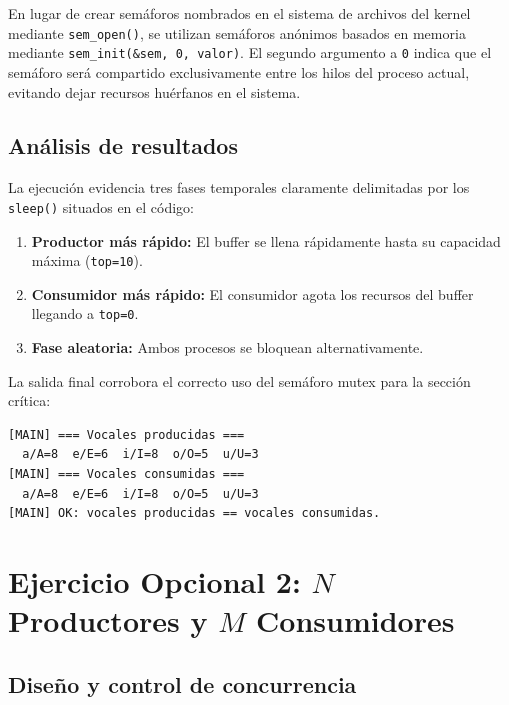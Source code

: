 \documentclass[a4paper, 12pt]{article}
\newcommand{\ic}[1]{\texttt{#1}}
\begin{document}
\begin{infobox}
  En lugar de crear semáforos nombrados en el sistema de archivos del kernel mediante \ic{sem\_open()}, se utilizan semáforos anónimos basados en memoria mediante \ic{sem\_init(\&sem, 0, valor)}. El segundo argumento a \ic{0} indica que el semáforo será compartido exclusivamente entre los hilos del proceso actual, evitando dejar recursos huérfanos en el sistema.
\end{infobox}

\subsection{Análisis de resultados}

La ejecución evidencia tres fases temporales claramente delimitadas por los \ic{sleep()} situados en el código:
\begin{enumerate}
    \item \textbf{Productor más rápido:} El buffer se llena rápidamente hasta su capacidad máxima (\ic{top=10}).
    \item \textbf{Consumidor más rápido:} El consumidor agota los recursos del buffer llegando a \ic{top=0}.
    \item \textbf{Fase aleatoria:} Ambos procesos se bloquean alternativamente.
\end{enumerate}

La salida final corrobora el correcto uso del semáforo mutex para la sección crítica:

\begin{lstlisting}[style=shellstyle]
[MAIN] === Vocales producidas ===
  a/A=8  e/E=6  i/I=8  o/O=5  u/U=3
[MAIN] === Vocales consumidas ===
  a/A=8  e/E=6  i/I=8  o/O=5  u/U=3
[MAIN] OK: vocales producidas == vocales consumidas.
\end{lstlisting}

\newpage

\section{Ejercicio Opcional 2: $N$ Productores y $M$ Consumidores}



\subsection{Diseño y control de concurrencia}
\end{document}

